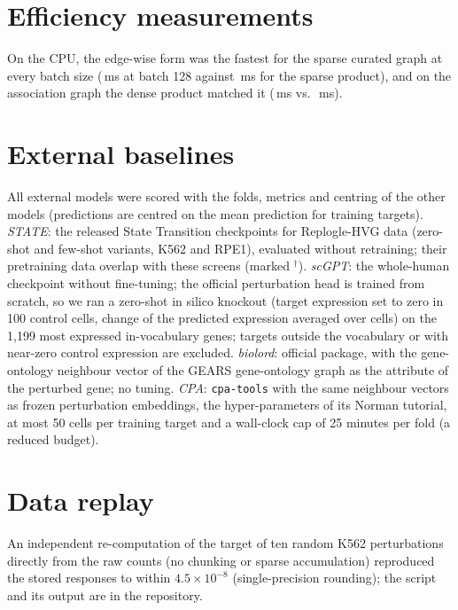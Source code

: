 \section{Efficiency measurements}
\label{app:bench}
\begin{table}[!ht]
\centering
\caption{Time per forward and backward step (ms) and peak memory (MB) of the regulator-shared Hill operator (24 updates, A100 40\,GB). E0: exact Hill, edge gather/scatter; E1: exact Hill, sparse matrix product; E2: dense product; C1: degree-16 Chebyshev form, sparse product.}
\label{tab:bench}
\footnotesize

\end{table}
On the CPU, the edge-wise form was the fastest for the sparse curated graph at every batch size (\,ms at batch 128 against \,ms for the sparse product), and on the association graph the dense product matched it (\,ms vs.\ \,ms).

\section{External baselines}
\label{app:external}
All external models were scored with the folds, metrics and centring of the other models (predictions are centred on the mean prediction for training targets). \emph{STATE}: the released State Transition checkpoints for Replogle-HVG data (zero-shot and few-shot variants, K562 and RPE1), evaluated without retraining; their pretraining data overlap with these screens (marked $^\dagger$). \emph{scGPT}: the whole-human checkpoint without fine-tuning; the official perturbation head is trained from scratch, so we ran a zero-shot in silico knockout (target expression set to zero in 100 control cells, change of the predicted expression averaged over cells) on the 1,199 most expressed in-vocabulary genes; targets outside the vocabulary or with near-zero control expression are excluded. \emph{biolord}: official package, with the gene-ontology neighbour vector of the GEARS gene-ontology graph as the attribute of the perturbed gene; no tuning. \emph{CPA}: \texttt{cpa-tools} with the same neighbour vectors as frozen perturbation embeddings, the hyper-parameters of its Norman tutorial, at most 50 cells per training target and a wall-clock cap of 25 minutes per fold (a reduced budget).

\section{Data replay}
\label{app:replay}
An independent re-computation of the target of ten random K562 perturbations directly from the raw counts (no chunking or sparse accumulation) reproduced the stored responses to within $4.5\times10^{-8}$ (single-precision rounding); the script and its output are in the repository.

